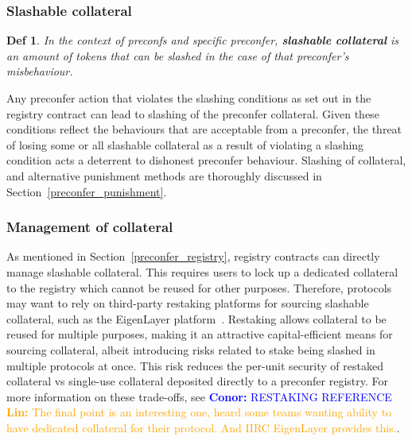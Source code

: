 \documentclass[a4paper]{article}
\theoremstyle{boldstyle}
\newtheorem*{definitionx}{Def}
\newenvironment{definition}
  {\begin{defopenboxq}\begin{definitionx}}
  {\end{definitionx}\end{defopenboxq}}
\newcommand{\cm}[1]{\textcolor{blue}{\textbf{Conor:} #1}}
\newcommand{\lo}[1]{\textcolor{orange}{\textbf{Lin:} #1}}
\newcommand{\dk}[1]{\textcolor{cyan}{\textbf{Demetris:} #1}}
\begin{document}
        \subsubsection{Slashable collateral}
        \begin{definition}
            In the context of preconfs and specific preconfer, \textbf{slashable collateral} is an amount of tokens that can be slashed in the case of that preconfer's misbehaviour. 
        \end{definition} 
        Any preconfer action that violates the slashing conditions as set out in the registry contract can lead to slashing of the preconfer collateral. Given these conditions reflect the behaviours that are acceptable from a preconfer, the threat of losing some or all slashable collateral as a result of violating a slashing condition acts a deterrent to dishonest preconfer behaviour. Slashing of collateral, and alternative punishment methods are thoroughly discussed in Section~\ref{preconfer_punishment}.  

        \subsubsection{Management of collateral}
        
        As mentioned in Section~\ref{preconfer_registry}, registry contracts can directly manage slashable collateral. This requires users to lock up a dedicated collateral to the registry which cannot be reused for other purposes. Therefore, protocols may want to rely on third-party restaking platforms for sourcing slashable collateral, such as the EigenLayer platform~\cite{W:RestakingOverview}. Restaking allows collateral to be reused for multiple purposes, making it an attractive capital-efficient means for sourcing collateral, albeit introducing risks related to stake being slashed in multiple protocols at once. This risk reduces the per-unit security of restaked collateral vs single-use collateral deposited directly to a preconfer registry. For more information on these trade-offs, see \cm{RESTAKING REFERENCE} \lo{The final point is an interesting one, heard some teams wanting ability to have dedicated collateral for their protocol. And IIRC EigenLayer provides this.}.
    
\end{document}

